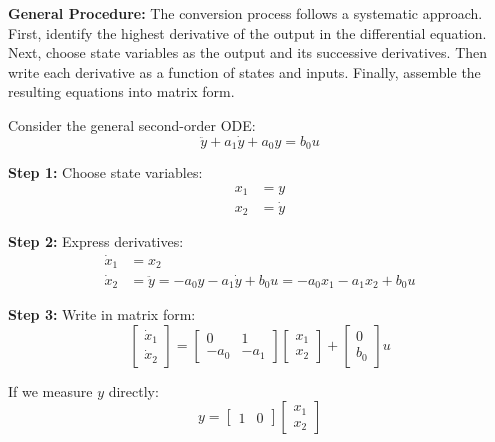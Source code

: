 \textbf{General Procedure:}
The conversion process follows a systematic approach. First, identify the highest derivative of the output in the differential equation. Next, choose state variables as the output and its successive derivatives. Then write each derivative as a function of states and inputs. Finally, assemble the resulting equations into matrix form.

\begin{example}
Consider the general second-order ODE:
\begin{equation}
    \ddot{y} + a_1\dot{y} + a_0 y = b_0 u
\end{equation}

\textbf{Step 1:} Choose state variables:
\begin{align}
    x_1 &= y \\
    x_2 &= \dot{y}
\end{align}

\textbf{Step 2:} Express derivatives:
\begin{align}
    \dot{x}_1 &= x_2 \\
    \dot{x}_2 &= \ddot{y} = -a_0 y - a_1 \dot{y} + b_0 u = -a_0 x_1 - a_1 x_2 + b_0 u
\end{align}

\textbf{Step 3:} Write in matrix form:
\begin{equation}
    \begin{bmatrix} \dot{x}_1 \\ \dot{x}_2 \end{bmatrix} =
    \begin{bmatrix} 0 & 1 \\ -a_0 & -a_1 \end{bmatrix}
    \begin{bmatrix} x_1 \\ x_2 \end{bmatrix} +
    \begin{bmatrix} 0 \\ b_0 \end{bmatrix} u
\end{equation}

If we measure $y$ directly:
\begin{equation}
    y = \begin{bmatrix} 1 & 0 \end{bmatrix} \begin{bmatrix} x_1 \\ x_2 \end{bmatrix}
\end{equation}
\end{example}

